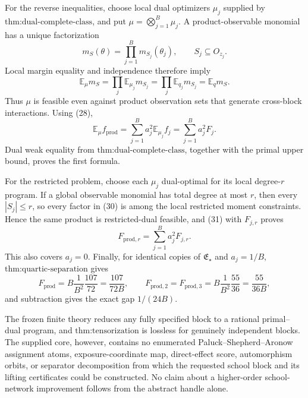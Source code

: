 For the reverse inequalities, choose local dual optimizers \(\mu_j\) supplied by \(\text{thm:dual-complete-class}\), and put \(\mu=\bigotimes_{j=1}^B\mu_j\).  A product-observable monomial has a unique factorization
\[
 m_S(\theta)=\prod_{j=1}^Bm_{S_j}(\theta_j),
 \quad\quad S_j\subseteq O_{z_j}.
\]
Local margin equality and independence therefore imply
\[
 \mathbb E_\mu m_S
 =\prod_j\mathbb E_{\mu_j}m_{S_j}
 =\prod_j\mathbb E_{q_j}m_{S_j}
 =\mathbb E_qm_S. \tag{30}
\]
Thus \(\mu\) is feasible even against product observation sets that generate cross-block interactions.  Using (28),
\[
 \mathbb E_\mu f_{\mathrm{prod}}
 =\sum_{j=1}^Ba_j^2\mathbb E_{\mu_j}f_j
 =\sum_{j=1}^Ba_j^2F_j. \tag{31}
\]
Dual weak equality from \(\text{thm:dual-complete-class}\), together with the primal upper bound, proves the first formula.

For the restricted problem, choose each \(\mu_j\) dual-optimal for its local degree-\(r\) program.  If a global observable monomial has total degree at most \(r\), then every \(|S_j|\le r\), so every factor in (30) is among the local restricted moment constraints.  Hence the same product is restricted-dual feasible, and (31) with \(F_{j,r}\) proves
\[
 F_{\mathrm{prod},r}=\sum_{j=1}^Ba_j^2F_{j,r}.
\]
This also covers \(a_j=0\).  Finally, for identical copies of \(\mathfrak E_\star\) and \(a_j=1/B\), \(\text{thm:quartic-separation}\) gives
\[
 F_{\mathrm{prod}}=B\frac1{B^2}\frac{107}{72}=\frac{107}{72B},
 \quad\quad
 F_{\mathrm{prod},2}=F_{\mathrm{prod},3}
 =B\frac1{B^2}\frac{55}{36}=\frac{55}{36B},
\]
and subtraction gives the exact gap \(1/(24B)\).

The frozen finite theory reduces any fully specified block to a rational primal--dual program, and \(\text{thm:tensorization}\) is lossless for genuinely independent blocks.  The supplied core, however, contains no enumerated Paluck--Shepherd--Aronow assignment atoms, exposure-coordinate map, direct-effect score, automorphism orbits, or separator decomposition from which the requested school block and its lifting certificates could be constructed.  No claim about a higher-order school-network improvement follows from the abstract handle alone.
